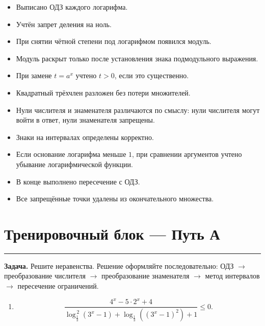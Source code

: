 \documentclass[a4paper,12pt]{article}
\newcommand{\topicline}{%
  \par\noindent
  {\color{accent!55}\rule{\linewidth}{0.6pt}}
  \par
}
\begin{document}
\begin{itemize}
\item[$\square$]
Выписано ОДЗ каждого логарифма.

\item[$\square$]
Учтён запрет деления на ноль.

\item[$\square$]
При снятии чётной степени под логарифмом появился модуль.

\item[$\square$]
Модуль раскрыт только после установления знака подмодульного выражения.

\item[$\square$]
При замене \(t=a^x\) учтено \(t>0\), если это существенно.

\item[$\square$]
Квадратный трёхчлен разложен без потери множителей.

\item[$\square$]
Нули числителя и знаменателя различаются по смыслу:
нули числителя могут войти в ответ,
нули знаменателя запрещены.

\item[$\square$]
Знаки на интервалах определены корректно.

\item[$\square$]
Если основание логарифма меньше \(1\),
при сравнении аргументов учтено убывание логарифмической функции.

\item[$\square$]
В конце выполнено пересечение с ОДЗ.

\item[$\square$]
Все запрещённые точки удалены из окончательного множества.
\end{itemize}


\clearpage
\section*{\color{darkaccent}Тренировочный блок --- Путь А}
\topicline

\textbf{Задача.}
Решите неравенства. Решение оформляйте последовательно:
ОДЗ \(\rightarrow\) преобразование числителя \(\rightarrow\)
преобразование знаменателя \(\rightarrow\)
метод интервалов \(\rightarrow\) пересечение ограничений.

\vspace{3mm}

\begin{enumerate}

\item
\[
\frac{
4^x-5\cdot2^x+4
}{
\log_{\frac13}^{\,2}(3^x-1)
+
\log_{\frac13}\!\left((3^x-1)^2\right)
+1
}
\le0.
\]



\end{enumerate}
\end{document}
